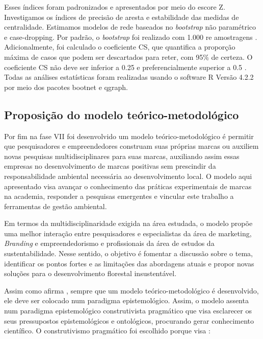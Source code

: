 Esses índices foram padronizados e apresentados por meio do escore Z. Investigamos os índices de precisão de aresta e estabilidade das medidas de centralidade. Estimamos modelos de rede baseados no \textit{bootstrap} não paramétrico e case-dropping. Por padrão, o \textit{bootstrap} foi realizado com 1.000 re amostragens \cite{Epskamp2018EstimatingPaper}. Adicionalmente, foi calculado o coeficiente CS, que quantifica a proporção máxima de casos que podem ser descartados para reter, com 95\% de certeza. O coeficiente CS não deve ser inferior a 0.25 e preferencialmente superior a 0.5 \cite{Epskamp2018EstimatingPaper}. Todas as análises estatísticas foram realizadas usando o software R Versão 4.2.2 por meio dos pacotes bootnet e qgraph.


\subsection{Proposição do modelo teórico-metodológico}

Por fim na fase VII foi desenvolvido um modelo teórico-metodológico é permitir que pesquisadores e empreendedores construam suas próprias marcas ou auxiliem novas pesquisas multidisciplinares para suas marcas, auxiliando assim essas empresas no desenvolvimento de marcas positivas sem prescindir da responsabilidade ambiental necessária ao desenvolvimento local. O modelo aqui apresentado visa avançar o conhecimento das práticas experimentais de marcas na academia, responder a pesquisas emergentes e vincular este trabalho a ferramentas de gestão ambiental.

Em termos da multidisciplinaridade exigida na área estudada, o modelo propõe uma melhor interação entre pesquisadores e especialistas da área de marketing, \textit{Branding} e empreendedorismo e profissionais da área de estudos da sustentabilidade. Nesse sentido, o objetivo é fomentar a discussão sobre o tema, identificar os pontos fortes e as limitações das abordagens atuais e propor novas soluções para o desenvolvimento florestal insustentável.

Assim como afirma , sempre que um modelo teórico-metodológico é desenvolvido, ele deve ser colocado num paradigma epistemológico. Assim, o modelo assenta num paradigma epistemológico construtivista pragmático que visa esclarecer os seus pressupostos epistemológicos e ontológicos, procurando gerar conhecimento científico. O construtivismo pragmático foi escolhido porque visa :


